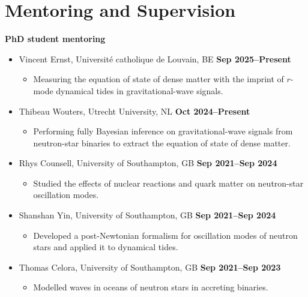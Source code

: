 \section{Mentoring and Supervision}

\textbf{PhD student mentoring}
%
\vspace*{0.05in}
\begin{itemize}
    \item[] Vincent Ernst, Universit{\'e} catholique de Louvain, BE
    \hfill \textbf{Sep 2025--Present}
    \begin{itemize}[nosep]
        \item[] Measuring the equation of state of dense matter with the
        imprint of $r$-mode dynamical tides in gravitational-wave signals.
    \end{itemize}
    \item[] Thibeau Wouters, Utrecht University, NL
    \hfill \textbf{Oct 2024--Present}
    \begin{itemize}[nosep]
        \item[] Performing fully Bayesian inference on gravitational-wave
        signals from neutron-star binaries to extract the equation of state of
        dense matter.
    \end{itemize}
    \item[] Rhys Counsell, University of Southampton, GB
    \hfill \textbf{Sep 2021--Sep 2024}
    \begin{itemize}[nosep]
        \item[] Studied the effects of nuclear reactions and quark matter on
        neutron-star oscillation modes.
    \end{itemize}
    \item[] Shanshan Yin, University of Southampton, GB
    \hfill \textbf{Sep 2021--Sep 2024}
    \begin{itemize}[nosep]
        \item[] Developed a post-Newtonian formalism for oscillation modes of
        neutron stars and applied it to dynamical tides.
    \end{itemize}
    \item[] Thomas Celora, University of Southampton, GB
    \hfill \textbf{Sep 2021--Sep 2023}
    \begin{itemize}[nosep]
        \item[] Modelled waves in oceans of neutron stars in accreting
        binaries.
    \end{itemize}
\end{itemize}

